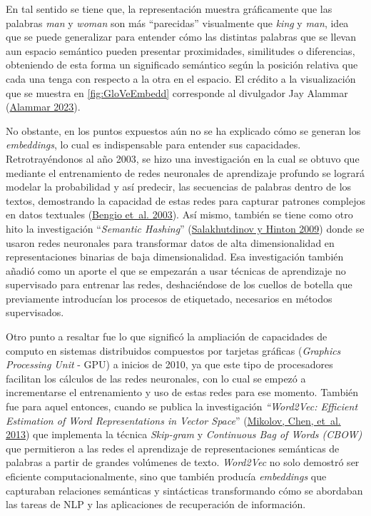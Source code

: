 \documentclass[
  12pt,
  openany]{book}
\begin{document}
En tal sentido se tiene que, la representación muestra gráficamente que las palabras \emph{man} y \emph{woman} son más ``parecidas'' visualmente que \emph{king} y \emph{man}, idea que se puede generalizar para entender cómo las distintas palabras que se llevan aun espacio semántico pueden presentar proximidades, similitudes o diferencias, obteniendo de esta forma un significado semántico según la posición relativa que cada una tenga con respecto a la otra en el espacio. El crédito a la visualización que se muestra en \ref{fig:GloVeEmbedd} corresponde al divulgador Jay Alammar (\protect\hyperlink{ref-wordtovec}{Alammar 2023}).

No obstante, en los puntos expuestos aún no se ha explicado cómo se generan los \emph{embeddings}, lo cual es indispensable para entender sus capacidades. Retrotrayéndonos al año 2003, se hizo una investigación en la cual se obtuvo que mediante el entrenamiento de redes neuronales de aprendizaje profundo se logrará modelar la probabilidad y así predecir, las secuencias de palabras dentro de los textos, demostrando la capacidad de estas redes para capturar patrones complejos en datos textuales (\protect\hyperlink{ref-Bengio:2003:NPL:944919.944966}{Bengio et~al. 2003}). Así mismo, también se tiene como otro hito la investigación ``\emph{Semantic Hashing}'' (\protect\hyperlink{ref-salakhutdinov2009}{Salakhutdinov y Hinton 2009}) donde se usaron redes neuronales para transformar datos de alta dimensionalidad en representaciones binarias de baja dimensionalidad. Esa investigación también añadió como un aporte el que se empezarán a usar técnicas de aprendizaje no supervisado para entrenar las redes, deshaciéndose de los cuellos de botella que previamente introducían los procesos de etiquetado, necesarios en métodos supervisados.

Otro punto a resaltar fue lo que significó la ampliación de capacidades de computo en sistemas distribuidos compuestos por tarjetas gráficas (\emph{Graphics Processing Unit} - GPU) a inicios de 2010, ya que este tipo de procesadores facilitan los cálculos de las redes neuronales, con lo cual se empezó a incrementarse el entrenamiento y uso de estas redes para ese momento. También fue para aquel entonces, cuando se publica la investigación \emph{``Word2Vec: Efficient Estimation of Word Representations in Vector Space}'' (\protect\hyperlink{ref-mikolov2013}{Mikolov, Chen, et~al. 2013}) que implementa la técnica \emph{Skip-gram} y \emph{Continuous Bag of Words (CBOW)} que permitieron a las redes el aprendizaje de representaciones semánticas de palabras a partir de grandes volúmenes de texto. \emph{Word2Vec} no solo demostró ser eficiente computacionalmente, sino que también producía \emph{embeddings} que capturaban relaciones semánticas y sintácticas transformando cómo se abordaban las tareas de NLP y las aplicaciones de recuperación de información.
\end{document}
